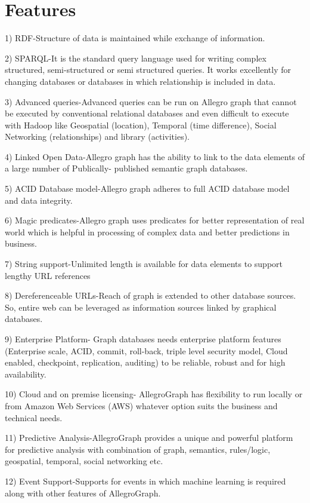 \documentclass[9pt,twocolumn,twoside]{styles/osajnl}
\begin{document}
\section{Features}
1) RDF-Structure of data is maintained while exchange of information.

2) SPARQL-It is the standard query language used for writing complex structured, semi-structured or semi structured queries. It works excellently for changing databases or databases in which relationship is included in data.

3) Advanced queries-Advanced queries can be run on Allegro graph that cannot be executed by conventional relational databases and even difficult to execute with Hadoop like Geospatial (location), Temporal (time difference), Social Networking (relationships) and library (activities).

4) Linked Open Data-Allegro graph has the ability to link to the data elements of a large number of
Publically- published semantic graph databases.

5) ACID Database model-Allegro graph adheres to full ACID database model and data integrity.

6) Magic predicates-Allegro graph uses predicates for better representation of real world which is helpful in processing of complex data and better predictions in business.

7) String support-Unlimited length is available for data elements to support lengthy URL references

8) Dereferenceable URLs-Reach of graph is extended to other database sources. So, entire web can be leveraged as information sources linked by graphical databases.

9)  Enterprise Platform- Graph databases needs enterprise platform features (Enterprise scale, ACID, commit, roll-back, triple level security model, Cloud enabled, checkpoint, replication, auditing) to be reliable, robust and for high availability.

10) Cloud and on premise licensing- AllegroGraph has flexibility to run locally or from Amazon Web Services (AWS) whatever option suits the business and technical needs.

11) Predictive Analysis-AllegroGraph provides a unique and powerful platform for predictive analysis with combination of graph, semantics, rules/logic, geospatial, temporal, social networking etc.

12) Event Support-Supports for events in which machine learning is required along with other features of AllegroGraph.
\end{document}
